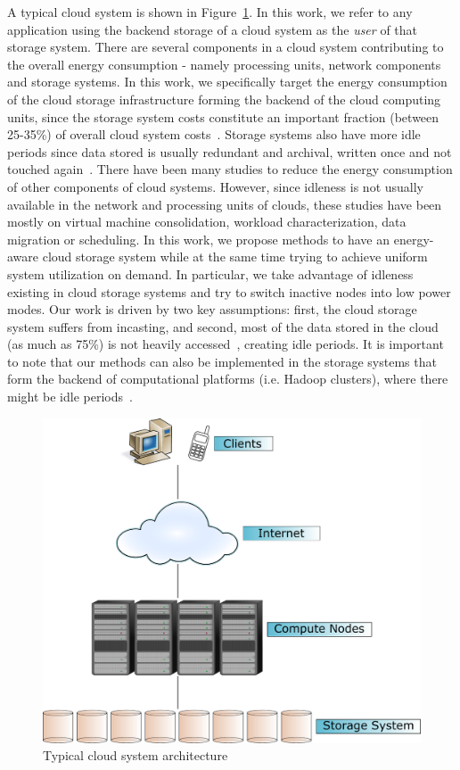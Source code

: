 \documentclass[preprint,12pt]{elsarticle}
\begin{document}
A typical cloud system is shown in Figure~\ref{fig:cloud_architecture}. In this work, we refer to any 
application using the backend storage of a cloud system as the \textit{user} of that storage system.
There are several components in a cloud system contributing to the overall energy consumption - namely
 processing units, network
components and storage systems. In this work, we specifically target the energy consumption of the
cloud storage infrastructure forming the backend of the cloud computing units, since the storage
system costs constitute an important fraction (between 25-35\%) of overall cloud system
costs~\cite{Harnik:2009:LPM:1586640.1587438, Kim:2011:EPD:1951365.1951378, netapp_power}. Storage
systems also have more idle periods since data stored is usually redundant and archival, written once
and not touched again~\cite{Miller93}. There have been many studies to reduce the energy consumption of
other components of cloud systems. However, since idleness is not usually available in the network
and processing units of clouds, these studies have been mostly on virtual machine consolidation,
workload characterization, data migration or scheduling. In this work, we propose methods to have
an energy-aware cloud storage system while at the same time trying to achieve uniform system
utilization on demand. In particular, we take advantage of idleness existing in cloud storage systems
and try to switch inactive nodes into low power modes. Our work is driven by two key assumptions: first,
the cloud storage system suffers from incasting, and second, most of the data stored in the cloud (as much
as 75\%) is not heavily accessed~\cite{netapp_power}, creating idle periods. It is
important to note that our methods can also be implemented in the storage systems that form the backend
of computational platforms (i.e. Hadoop clusters), where there might be idle
periods~\cite{Kaushik:2010:GTE:1924920.1924927, Narayanan:2008:WOP:1416944.1416949}.


\begin{figure}[!htbp]
\centering
\includegraphics[width=\columnwidth,keepaspectratio]{FIG1.pdf}
\caption{Typical cloud system architecture}
\label{fig:cloud_architecture}
\end{figure}
\end{document}

